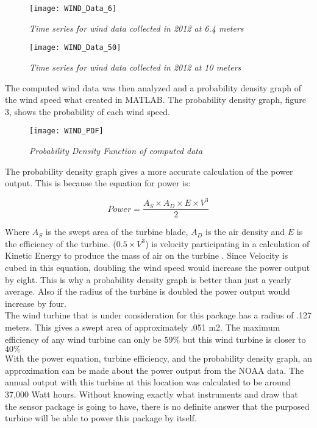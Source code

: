 \begin{figure}[H]
\centering
\texttt{[image: WIND\_Data\_6]}
\caption{\textit{Time series for wind data collected in 2012 at 6.4 meters}}
\label{fig:WIND_6.4}
\end{figure}

\begin{figure}[H]
\centering
\texttt{[image: WIND\_Data\_50]}
\caption{\textit{Time series for wind data collected in 2012 at 10 meters}}
\label{fig:WIND_50}
\end{figure}

\indent The computed wind data was then analyzed and a probability
density graph of the wind speed what created in MATLAB. The
probability density graph, figure 3, shows the probability of each
wind speed.

\begin{figure}[H]
\centering
\texttt{[image: WIND\_PDF]}
\caption{\textit{Probability Density Function of computed data}}
\label{fig:WIND_PDF}
\end{figure}

\indent The probability density graph gives a more accurate
calculation of the power output. This is because the equation for
power is:

\begin{equation}
Power = \frac{A_{S} \times A_{D} \times E \times V^{3}}{2}
\end{equation}

\indent Where $A_{S}$ is the swept area of the turbine blade,
$A_{D}$ is the air density and $E$ is the efficiency of the
turbine. ($0.5 \times V^{3}$) is velocity participating in a
calculation of Kinetic Energy to produce the mass of air on the
turbine \cite{arcGIS:2013}. Since Velocity is cubed in this
equation, doubling the wind speed would increase the power
output by eight. This is why a probability density graph is
better than just a yearly average. Also if the radius of the
turbine is doubled the power output would increase by four.
 \\
\indent The wind turbine that is under consideration for this
package has a radius of .127 meters. This gives a swept area of
approximately .051 m2. The maximum efficiency of any wind turbine
can only be $59\%$ but this wind turbine is closer to $40\%$
\cite{Windpower}\\

\indent With the power equation, turbine efficiency, and the
probability density graph, an approximation can be made about the
power output from the NOAA data. The annual output with this
turbine at this location was calculated to be around 37,000 Watt
hours. Without knowing exactly what instruments and draw that
the sensor package is going to have, there is no definite
answer that the purposed turbine will be able to power this
package by itself. 
